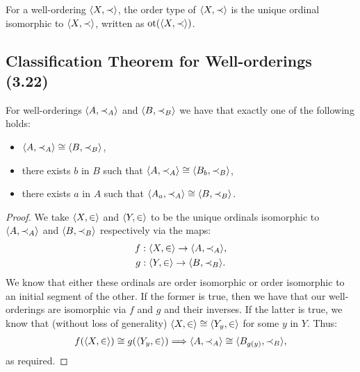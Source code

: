 For a well-ordering ${\langle X, \prec \rangle}$, the order type of ${\langle X, \prec \rangle}$
is the unique ordinal isomorphic to ${\langle X, \prec \rangle}$, written as
$\operatorname{ot}({\langle X, \prec \rangle})$.

\subsection{Classification Theorem for Well-orderings (3.22)} \label{3.22}

For well-orderings ${\langle A, \prec_A \rangle}$ and ${\langle B, \prec_B \rangle}$
we have that exactly one of the following holds: \begin{itemize}
    \item ${\langle A, \prec_A \rangle} \cong {\langle B, \prec_B \rangle}$,
    \item there exists $b$ in $B$ such that 
        ${\langle A, \prec_A \rangle} \cong {\langle B_b, \prec_B \rangle}$,
    \item there exists $a$ in $A$ such that 
        ${\langle A_a, \prec_A \rangle} \cong {\langle B, \prec_B \rangle}$.
\end{itemize}

\begin{proof}
    We take ${\langle X, \in \rangle}$ and ${\langle Y, \in \rangle}$ to be the unique ordinals
    isomorphic to ${\langle A, \prec_A \rangle}$ and ${\langle B, \prec_B \rangle}$ respectively
    via the maps: \begin{align*}
        f &: {\langle X, \in \rangle} \to {\langle A, \prec_A \rangle}, \\
        g &: {\langle Y, \in \rangle} \to {\langle B, \prec_B \rangle}.
    \end{align*} We know that either these ordinals are order isomorphic
    or order isomorphic to an initial segment of the other. If the
    former is true, then we have that our well-orderings are isomorphic
    via $f$ and $g$ and their inverses. If the latter is true,
    we know that (without loss of generality) 
    ${\langle X, \in \rangle} \cong {\langle Y_y, \in \rangle}$ for some $y$ in $Y$.
    Thus: \begin{align*}
        f({\langle X, \in \rangle}) \cong g({\langle Y_y, \in \rangle})
        \Longrightarrow
        {\langle A, \prec_A \rangle} \cong {\langle B_{g(y)}, \prec_B \rangle},
    \end{align*} as required.
\end{proof}
